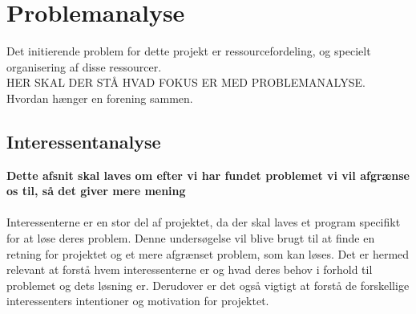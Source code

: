 \chapter{Problemanalyse}\label{ch:ch2label}




Det initierende problem for dette projekt er ressourcefordeling, og specielt organisering af disse ressourcer. \\ 

HER SKAL DER STÅ HVAD FOKUS ER MED PROBLEMANALYSE. \\ 

Hvordan hænger en forening sammen.




\section{Interessentanalyse}
\textbf{Dette afsnit skal laves om efter vi har fundet problemet vi vil afgrænse os til, så det giver mere mening}
\\ \\
Interessenterne er en stor del af projektet, da der skal laves et program specifikt for at løse deres problem. Denne undersøgelse vil blive brugt til at finde en retning for projektet og et mere afgrænset problem, som kan løses. Det er hermed relevant at forstå hvem interessenterne er og hvad deres behov i forhold til problemet og dets løsning er. Derudover er det også vigtigt at forstå de forskellige interessenters intentioner og motivation for projektet.

